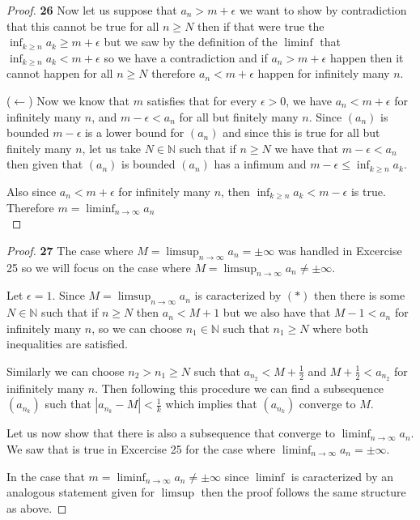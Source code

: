 \documentclass[11pt]{article}
\newcommand{\N}{\mathbb{N}}
\theoremstyle{definition}
\begin{document}
\begin{proof}{\textbf{26}}
        Now let us suppose that $a_n > m+\epsilon$  we want to show by contradiction
        that this cannot be true for all $n \geq N$ then if that were true the
        $\inf_{k \geq n} a_k \geq m +\epsilon$ but we saw by the definition of the
        $\liminf$ that $\inf_{k \geq n} a_k < m+ \epsilon$ so we have a
        contradiction and if  $a_n > m+\epsilon$ happen then it cannot happen for all
        $n\geq N$ therefore $a_n<m+\epsilon$ happen for infinitely many $n$.

        ($\leftarrow$) Now we know that $m$ satisfies that for every $\epsilon >0$,
        we have $a_n < m+\epsilon$  for infinitely many $n$, and $m-\epsilon<a_n$
        for all but finitely many $n$.
        Since $(a_n)$ is bounded $m-\epsilon$ is a lower bound for $(a_n)$ and since
        this is true for all but finitely many $n$, let us take $N \in \N$ such that if
        $n \geq N$ we have that  $m- \epsilon< a_n$ then given that $(a_n)$ is bounded
        $(a_n)$ has a infimum and $m-\epsilon \leq \inf_{k\geq n} a_k$.

        Also since $a_n<m+\epsilon$ for infinitely many $n$, then 
        $\inf_{k\geq n} a_k < m - \epsilon$ is true.
        Therefore $m = \liminf_{n\to \infty} a_n$\\
    \end{proof}
    \begin{proof}{\textbf{27}}
        The case where $M = \limsup_{n \to \infty} a_n = \pm\infty$ was handled in
        Excercise 25 so we will focus on the case where
        $M = \limsup_{n \to \infty} a_n \neq \pm\infty$.

        Let $\epsilon = 1$. Since $M = \limsup_{n \to \infty} a_n$ is caracterized by
        $(*)$ then there is some $N \in \N$ such that if $n \geq N$ then $a_n < M + 1$
        but we also have that $M - 1 < a_n$ for infinitely many $n$, so we can choose
        $n_1 \in \N$ such that $n_1 \geq N$ where both inequalities are satisfied.

        Similarly we can choose $n_2 > n_1 \geq N$ such that
        $a_{n_2} < M + \frac{1}{2}$ and $M + \frac{1}{2}< a_{n_2}$ for inifinitely many
        $n$. Then following this procedure we can find a subsequence $(a_{n_k})$ such
        that $|a_{n_k} - M| < \frac{1}{k}$ which implies that $(a_{n_k})$ converge to
        $M$.

        Let us now show that there is also a subsequence that converge to
        $\liminf_{n \to \infty} a_n$. We saw that is true in Excercise 25 for the case
        where  $\liminf_{n \to \infty} a_n = \pm \infty$.
        
        In the case that $m = \liminf_{n \to \infty} a_n \neq \pm\infty$ since 
        $\liminf$ is caracterized by an analogous statement given for $\limsup$ then
        the proof follows the same structure as above.
    \end{proof}
\end{document}
